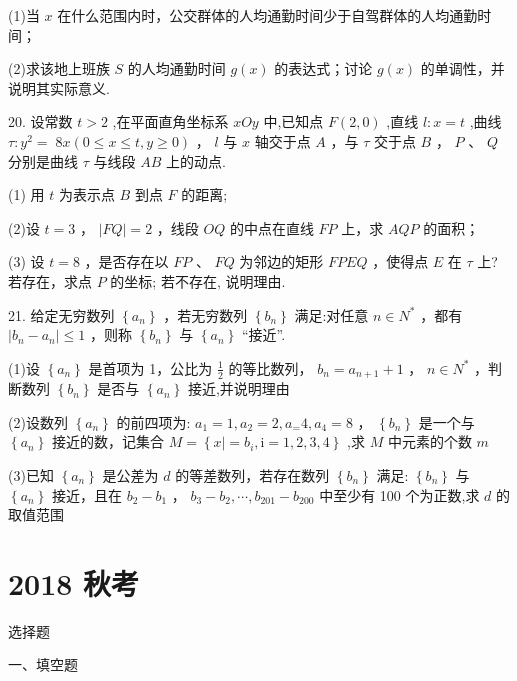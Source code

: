 \documentclass[10pt]{article}
\begin{document}
(1)当 \(x\) 在什么范围内时，公交群体的人均通勤时间少于自驾群体的人均通勤时间；

(2)求该地上班族 \(S\) 的人均通勤时间 \(g\left( x\right)\) 的表达式；讨论 \(g\left( x\right)\) 的单调性，并说明其实际意义.

20. 设常数 \(t > 2\) ,在平面直角坐标系 \({xOy}\) 中,已知点 \(F\left( {2,0}\right)\) ,直线 \(l : x = t\) ,曲线 \(\tau  : {y}^{2} = \; {8x}\left( {0 \leq  x \leq  t,y \geq  0}\right)\) ， \(l\) 与 \(x\) 轴交于点 \(A\) ，与 \(\tau\) 交于点 \(B\) ， \(P\) 、 \(Q\) 分别是曲线 \(\tau\) 与线段 \({AB}\) 上的动点.

(1) 用 \(t\) 为表示点 \(B\) 到点 \(F\) 的距离;

(2)设 \(t = 3\) ， \(\left| {FQ}\right|  = 2\) ，线段 \({OQ}\) 的中点在直线 \({FP}\) 上，求 \({AQP}\) 的面积；

(3) 设 \(t = 8\) ，是否存在以 \({FP}\) 、 \({FQ}\) 为邻边的矩形 \({FPEQ}\) ，使得点 \(E\) 在 \(\tau\) 上? 若存在，求点 \(P\) 的坐标; 若不存在, 说明理由.

21. 给定无穷数列 \(\left\{  {a}_{n}\right\}\) ，若无穷数列 \(\left\{  {b}_{n}\right\}\) 满足:对任意 \(n \in  {N}^{ * }\) ，都有 \(\left| {{b}_{n} - {a}_{n}}\right|  \leq  1\) ，则称 \(\left\{  {b}_{n}\right\}\) 与 \(\left\{  {a}_{n}\right\}\) “接近”.

(1)设 \(\left\{  {a}_{n}\right\}\) 是首项为 1，公比为 \(\frac{1}{2}\) 的等比数列， \({b}_{n} = {a}_{n + 1} + 1\) ， \(n \in  {N}^{ * }\) ，判断数列 \(\left\{  {b}_{n}\right\}\) 是否与 \(\left\{  {a}_{n}\right\}\) 接近,并说明理由

(2)设数列 \(\left\{  {a}_{n}\right\}\) 的前四项为: \({a}_{1} = 1,{a}_{2} = 2,{a}_{ = }4,{a}_{4} = 8\) ， \(\left\{  {b}_{n}\right\}\) 是一个与 \(\left\{  {a}_{n}\right\}\) 接近的数，记集合 \(M = \left\{  {x \mid   = {b}_{i},\mathrm{i} = 1,2,3,4}\right\}\) ,求 \(M\) 中元素的个数 \(m\)

(3)已知 \(\left\{  {a}_{n}\right\}\) 是公差为 \(d\) 的等差数列，若存在数列 \(\left\{  {b}_{n}\right\}\) 满足: \(\left\{  {b}_{n}\right\}\) 与 \(\left\{  {a}_{n}\right\}\) 接近，且在 \({b}_{2} - {b}_{1}\) ， \({b}_{3} - {b}_{2},\cdots ,{b}_{201} - {b}_{200}\) 中至少有 100 个为正数,求 \(d\) 的取值范围

\section*{2018 秋考}

选择题

一、填空题
\end{document}
